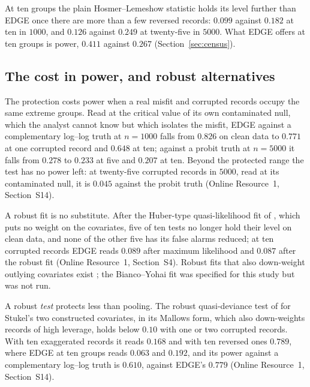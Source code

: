 At ten groups the plain Hosmer--Lemeshow statistic holds its level further than EDGE once there are
more than a few reversed records: $0.099$ against $0.182$ at ten in $1000$, and $0.126$ against $0.249$ at
twenty-five in $5000$. What EDGE offers at ten groups is power, $0.411$ against $0.267$
(Section~\ref{sec:census}).

\subsection{The cost in power, and robust alternatives}\label{sec:cost}\label{sec:robustest}

The protection costs power when a real misfit and corrupted records occupy the same extreme groups.
Read at the critical value of its own contaminated null, which the analyst cannot know but which
isolates the misfit, EDGE against a
complementary log--log truth at $n=1000$ falls from $0.826$ on clean data to $0.771$ at one corrupted
record and $0.648$ at ten; against a probit truth at $n=5000$ it falls from $0.278$ to $0.233$ at five
and $0.207$ at ten. Beyond the protected range the test has no power left: at twenty-five corrupted
records in $5000$, read at its contaminated null, it is $0.045$ against the probit truth (Online
Resource~1, Section~S14).

A robust fit is no substitute. After the Huber-type quasi-likelihood fit of
\citet{cantoni2001robust}, which puts no weight on the covariates, five of ten tests no longer hold
their level on clean data, and none of the other five has its false alarms reduced; at ten corrupted
records EDGE reads $0.089$ after maximum likelihood and $0.087$ after the robust fit (Online
Resource~1, Section~S4). Robust fits that also down-weight outlying covariates exist
\citep{bianco1996robust,croux2003implementing}; the Bianco--Yohai fit was specified for this study but
was not run.

A robust \emph{test} protects less than pooling. The robust quasi-deviance test of
\citet{cantoni2001robust} for Stukel's two constructed covariates, in its Mallows form, which also
down-weights records of high leverage, holds below $0.10$ with one or two corrupted records. With ten
exaggerated records it reads $0.168$ and with ten reversed ones $0.789$, where EDGE at ten groups reads
$0.063$ and $0.192$, and its power against a complementary log--log truth is $0.610$, against EDGE's
$0.779$ (Online Resource~1, Section~S14).
